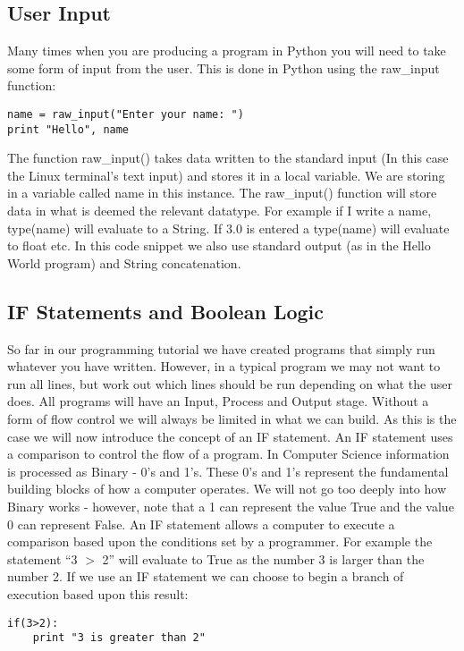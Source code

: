 \documentclass[twocolumn]{article}
\begin{document}
\subsection{User Input}
Many times when you are producing a program in Python you will need to take some form of input from the user. This is done in Python using the raw\_input function:
\begin{lstlisting}
name = raw_input("Enter your name: ") 
print "Hello", name
\end{lstlisting}
The function raw\_input() takes data written to the standard input (In this case the Linux terminal's text input) and stores it in a local variable. We are storing in a variable called name in this instance. The raw\_input() function will store data in what is deemed the relevant datatype. For example if I write a name, type(name) will evaluate to a String. If 3.0 is entered a type(name) will evaluate to float etc. In this code snippet we also use standard output (as in the Hello World program) and String concatenation. 

\subsection{IF Statements and Boolean Logic}

So far in our programming tutorial we have created programs that simply run whatever you have written. However, in a typical program we may not want to run all lines, but work out which lines should be run depending on what the user does. All programs will have an Input, Process and Output stage. Without a form of flow control we will always be limited in what we can build. As this is the case we will now introduce the concept of an IF statement. An IF statement uses a comparison to control the flow of a program. In Computer Science information is processed as Binary - 0's and 1's. These 0's and 1's represent the fundamental building blocks of how a computer operates. We will not go too deeply into how Binary works - however, note that a 1 can represent the value True and the value 0 can represent False. An IF statement allows a computer to execute a comparison based upon the conditions set by a programmer. For example the statement ``3 $>$ 2'' will evaluate to True as the number 3 is larger than the number 2. If we use an IF statement we can choose to begin a branch of execution based upon this result:
\begin{lstlisting}
if(3>2):
	print "3 is greater than 2"
\end{lstlisting}
\end{document}

